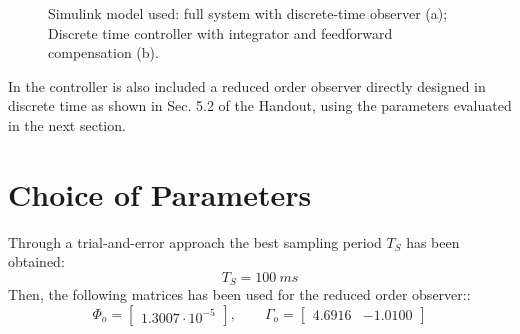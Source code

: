 \documentclass[11pt]{article}
\begin{document}
	\begin{figure}[h]
		\centering
		\quad
		\caption{Simulink model used: full system with discrete-time observer (a); Discrete time controller with integrator and feedforward compensation (b).}
		\label{fig:model}
	\end{figure}
In the controller is also included a reduced order observer directly designed in discrete time as shown in Sec. 5.2 of the Handout, using the parameters evaluated in the next section.

\section{Choice of Parameters}
Through a trial-and-error approach the best sampling period $T_S$ has been obtained:
	\begin{equation}
		T_S=100\:ms
	\end{equation} 
Then, the following matrices has been used for the reduced order observer::
\begin{equation}
\Phi_o = 
	\left[
	\begin{array}{cccccc}
	1.3007\cdot 10^{-5} 
	\end{array}
	\right] ,
\qquad 
\Gamma_o 
= 
	\left[
	\begin{array}{ccc}
	4.6916  & -1.0100
	\end{array}
	\right]
\end{equation}
\end{document}
